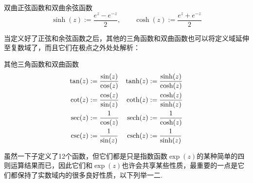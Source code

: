 \documentclass[main.tex]{subfiles}
\begin{document}
\begin{definition}{双曲正弦函数和双曲余弦函数}
    \[\sinh(z) := \frac{e^z-e^{-z}}{2}, \qquad \cosh(z) := \frac{e^z+e^{-z}}{2}\]
\end{definition}

当定义好了正弦和余弦函数之后，其他的三角函数和双曲函数也可以将定义域延伸至复数域了，而且它们在极点之外处处解析：
\begin{definition}{其他三角函数和双曲函数}
    \[
    \begin{aligned}
        \tan(z) &:= \frac{\sin(z)}{\cos(z)} &  \tanh(z) &:= \frac{\sinh(z)}{\cosh(z)}\\
        \cot(z) &:= \frac{\cos(z)}{\sin(z)} & \coth(z) &:= \frac{\cosh(z)}{\sinh(z)} \\
        \sec(z) &:= \frac{1}{\cos(z)} & {\rm sech}(z) &:= \frac{1}{\cosh(z)} \\
        \csc(z) &:= \frac{1}{\sin(z)} & {\rm csch}(z) &:= \frac{1}{\sinh(z)}
    \end{aligned}
    \]  
\end{definition}

虽然一下子定义了12个函数，但它们都是只是指数函数\(\exp(z)\)的某种简单的四则运算结果而已，因此它们和\(\exp(z)\)也许会共享某些性质，最重要的一点是它们都保持了实数域内的很多良好性质，以下列举一二.
\end{document}
